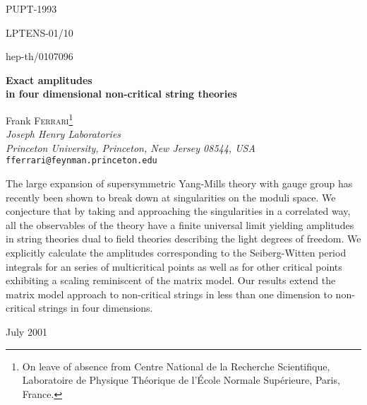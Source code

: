 \documentclass[a4paper,12pt]{article}
\def\suN{{\rm SU}(N)}
\begin{document}
%
%
\pagestyle{empty}
%
{\parskip 0in
\hfill PUPT-1993

\hfill LPTENS-01/10

\hfill hep-th/0107096}

\vfill
%
\begin{center}
{\large\bf Exact amplitudes} \\
\medskip
{\large\bf in four dimensional non-critical string theories}

\vspace{0.4in}

Frank F{\scshape errari}\footnote{On leave of absence from Centre 
National de la Recherche Scientifique, Laboratoire de Physique 
Th\'eorique de l'\'Ecole Normale Sup\'erieure, Paris, France.}\\
\medskip
{\it Joseph Henry Laboratories\\
Princeton University, Princeton, New Jersey 08544, USA}\\
\smallskip
{\tt fferrari@feynman.princeton.edu}
\end{center}


\vfill\noindent
The large \coordHE{} expansion of \coordHE{} supersymmetric Yang-Mills theory 
with gauge group \myHighlight{$\suN$}\coordHE{} has 
recently been shown to break down at singularities on the moduli space. 
We conjecture that by taking \coordHE{} and approaching the
singularities in a correlated way, all the observables of the theory have
a finite universal limit yielding amplitudes in string theories dual to
field theories describing the light degrees of freedom.
We explicitly calculate the amplitudes corresponding to the
Seiberg-Witten period integrals for an \coordHE{} series of 
multicritical points as well as for other critical points 
exhibiting a scaling reminiscent of the \coordHE{} matrix model.
Our results extend the matrix model approach to non-critical 
strings in less than one dimension to non-critical strings in 
four dimensions.
\vfill
\begin{flushleft}
July 2001
\end{flushleft}

\newpage\pagestyle{plain}
\baselineskip 16pt
%
\end{document}
